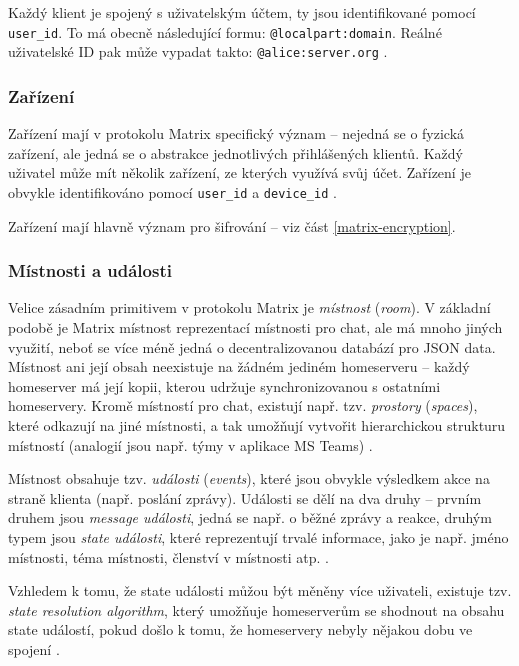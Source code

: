 Každý klient je spojený s uživatelským účtem, ty jsou identifikované pomocí
\texttt{user_id}. To má obecně následující formu:
\texttt{@localpart:domain}. Reálné uživatelské ID pak může vypadat
takto: \texttt{@alice:server.org} \cite{MatrixORG-Spec}.

\subsubsection{Zařízení}

Zařízení mají v protokolu Matrix specifický význam -- nejedná se o fyzická
zařízení, ale jedná se o abstrakce jednotlivých přihlášených klientů. Každý
uživatel může mít několik zařízení, ze kterých využívá svůj účet. Zařízení je
obvykle identifikováno pomocí \texttt{user_id} a
\texttt{device_id} \cite{MatrixORG-Spec}.

Zařízení mají hlavně význam pro šifrování -- viz část \ref{matrix-encryption}.

\subsubsection{Místnosti a události}

Velice zásadním primitivem v protokolu Matrix je \textit{místnost}
(\textit{room}). V základní podobě je Matrix místnost reprezentací místnosti
pro chat, ale má mnoho jiných využití, neboť se více méně jedná o
decentralizovanou databází pro JSON data. Místnost ani její obsah neexistuje na
žádném jediném homeserveru -- každý homeserver má její kopii, kterou udržuje
synchronizovanou s ostatními homeservery. Kromě místností pro chat, existují
např. tzv. \textit{prostory} (\textit{spaces}), které odkazují na jiné
místnosti, a tak umožňují vytvořit hierarchickou strukturu místností (analogií
jsou např. týmy v aplikace MS Teams) \cite{MatrixORG-Spec}.

Místnost obsahuje tzv. \textit{události} (\textit{events}), které jsou obvykle
výsledkem akce na straně klienta (např. poslání zprávy). Události se dělí na dva
druhy -- prvním druhem jsou \textit{message události}, jedná se např. o běžné
zprávy a reakce, druhým typem jsou \textit{state události}, které reprezentují
trvalé informace, jako je např. jméno místnosti, téma místnosti, členství v
místnosti atp. \cite{MatrixORG-Spec}.

Vzhledem k tomu, že state události můžou být měněny více uživateli, existuje tzv.
\textit{state resolution algorithm}, který umožňuje homeserverům se shodnout na
obsahu state událostí, pokud došlo k tomu, že homeservery nebyly nějakou dobu ve
spojení \cite{MatrixORG-Spec}.

